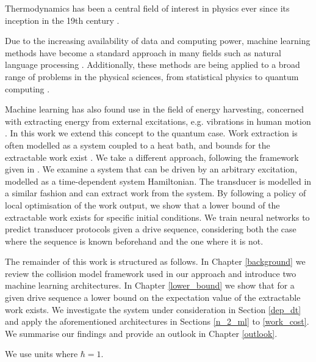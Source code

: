 Thermodynamics has been a central field of interest in physics ever since its inception in the 19th century \cite{thomson_2011}.

Due to the increasing availability of data and computing power, machine learning methods have become a standard approach in many fields such as natural language processing \cite{DBLP:journals/corr/VaswaniSPUJGKP17}.
Additionally, these methods are being applied to a broad range of problems in the physical sciences, from statistical physics to quantum computing \cite{Carleo_2019, wise2021using}.

Machine learning has also found use in the field of energy harvesting, concerned with extracting energy from external excitations, e.g. vibrations in human motion \cite{Liu2019}.
In this work we extend this concept to the quantum case.
Work extraction is often modelled as a system coupled to a heat bath, and bounds for the extractable work exist \cite{Egloff_2015}.
We take a different approach, following the framework given in \cite{beyer2020}.
We examine a system that can be driven by an arbitrary excitation, modelled as a time-dependent system Hamiltonian.
The transducer is modelled in a similar fashion and can extract work from the system.
By following a policy of local optimisation of the work output, we show that a lower bound of the extractable work exists for specific initial conditions.
We train neural networks to predict transducer protocols given a drive sequence, considering both the case where the sequence is known beforehand and the one where it is not.

The remainder of this work is structured as follows.
In Chapter \ref{background} we review the collision model framework used in our approach and introduce two machine learning architectures.
In Chapter \ref{lower_bound} we show that for a given drive sequence a lower bound on the expectation value of the extractable work exists.
We investigate the system under consideration in Section \ref{dep_dt} and apply the aforementioned architectures in Sections \ref{n_2_ml} to \ref{work_cost}.
We summarise our findings and provide an outlook in Chapter \ref{outlook}.

We use units where $\hbar = 1$.